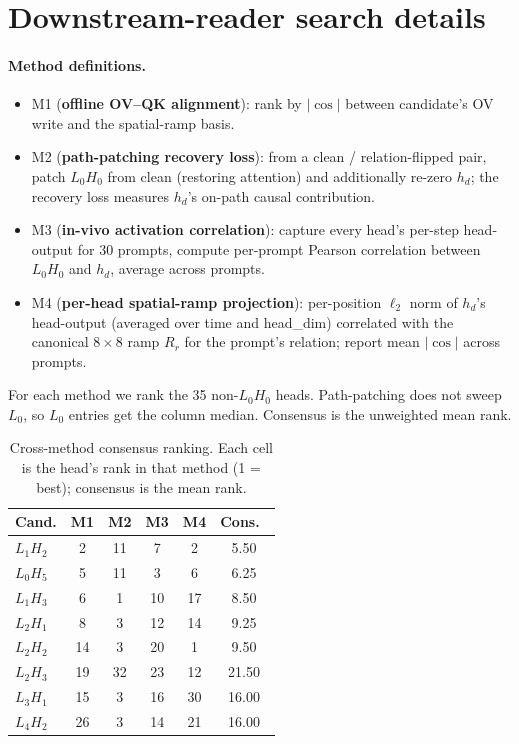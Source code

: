 \documentclass{article}
\begin{document}
\section{Downstream-reader search details}
\label{app:reader}

\paragraph{Method definitions.}
\begin{itemize}
\item M1 (\textbf{offline OV--QK alignment}): rank by $|\cos|$ between candidate's OV write and the spatial-ramp basis.
\item M2 (\textbf{path-patching recovery loss}): from a clean / relation-flipped pair, patch $L_0H_0$ from clean (restoring attention) and additionally re-zero $h_d$; the recovery loss measures $h_d$'s on-path causal contribution.
\item M3 (\textbf{in-vivo activation correlation}): capture every head's per-step head-output for 30 prompts, compute per-prompt Pearson correlation between $L_0H_0$ and $h_d$, average across prompts.
\item M4 (\textbf{per-head spatial-ramp projection}): per-position $\ell_2$ norm of $h_d$'s head-output (averaged over time and head\_dim) correlated with the canonical $8\!\times\!8$ ramp $R_r$ for the prompt's relation; report mean $|\cos|$ across prompts.
\end{itemize}
For each method we rank the 35 non-$L_0H_0$ heads. Path-patching does not sweep $L_0$, so $L_0$ entries get the column median. Consensus is the unweighted mean rank.

\begin{table}[h]
\centering
\small
\caption{Cross-method consensus ranking. Each cell is the head's rank in that method (1 = best); consensus is the mean rank.}
\label{tab:consensus}
\begin{tabular}{lccccc}
\toprule
Cand. & M1 & M2 & M3 & M4 & Cons.\ \\
\midrule
$L_1H_2$ &  2 & 11 &  7 &  2 &  5.50 \\
$L_0H_5$ &  5 & 11 &  3 &  6 &  6.25 \\
$L_1H_3$ &  6 &  1 & 10 & 17 &  8.50 \\
$L_2H_1$ &  8 &  3 & 12 & 14 &  9.25 \\
$L_2H_2$ & 14 &  3 & 20 &  1 &  9.50 \\
\midrule
$L_2H_3$ & 19 & 32 & 23 & 12 & 21.50 \\
$L_3H_1$ & 15 &  3 & 16 & 30 & 16.00 \\
$L_4H_2$ & 26 &  3 & 14 & 21 & 16.00 \\
\bottomrule
\end{tabular}
\end{table}
\end{document}
